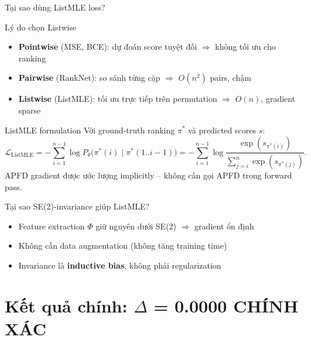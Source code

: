 \documentclass[aspectratio=169,10pt]{beamer}
\begin{document}
\begin{frame}{Tại sao dùng ListMLE loss?}
\begin{block}{Lý do chọn Listwise}
\scriptsize
\begin{itemize}
  \item \textbf{Pointwise} (MSE, BCE): dự đoán score tuyệt đối $\Rightarrow$ không tối ưu cho ranking
  \item \textbf{Pairwise} (RankNet): so sánh từng cặp $\Rightarrow$ $O(n^2)$ pairs, chậm
  \item \textbf{Listwise} (ListMLE): tối ưu trực tiếp trên permutation $\Rightarrow$ $O(n)$, gradient sparse
\end{itemize}
\end{block}

\begin{block}{ListMLE formulation}
\scriptsize
Với ground-truth ranking $\pi^*$ và predicted scores $s$:
\[
\mathcal{L}_{\text{ListMLE}} = -\sum_{i=1}^{n-1} \log P_{\theta}\big(\pi^*(i) \mid \pi^*(1..i-1)\big)
= -\sum_{i=1}^{n-1} \log \frac{\exp(s_{\pi^*(i)})}{\sum_{j=i}^{n} \exp(s_{\pi^*(j)})}.
\]
APFD gradient được ước lượng implicitly -- không cần gọi APFD trong forward pass.
\end{block}

\begin{block}{Tại sao SE(2)-invariance giúp ListMLE?}
\scriptsize
\begin{itemize}
  \item Feature extraction $\Phi$ giữ nguyên dưới SE(2) $\Rightarrow$ gradient ổn định
  \item Không cần data augmentation (không tăng training time)
  \item Invariance là \textbf{inductive bias}, không phải regularization
\end{itemize}
\end{block}
\end{frame}

\section{Kết quả chính: $\Delta$ = 0.0000 CHÍNH XÁC}
\end{document}
